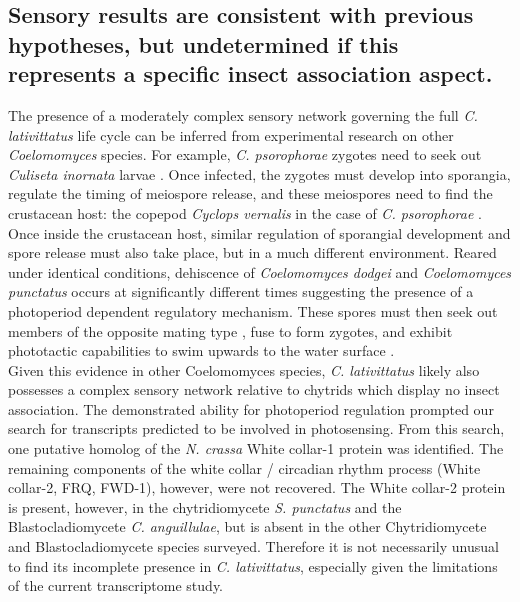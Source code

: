 \subsection*{Sensory results are consistent with previous hypotheses, but undetermined if this represents a specific insect association aspect.}
The presence of a moderately complex sensory network governing the full \textit{C. lativittatus} life cycle can be inferred from experimental research on other \textit{Coelomomyces} species. For example, \textit{C. psorophorae} zygotes need to seek out \textit{Culiseta inornata} larvae \cite{Whisler1975}. Once infected, the zygotes must develop into sporangia, regulate the timing of meiospore release, and these meiospores need to find the crustacean host: the copepod \textit{Cyclops vernalis} in the case of \textit{C. psorophorae} \cite{Whisler1974}. Once inside the crustacean host, similar regulation of sporangial development and spore release must also take place, but in a much different environment. Reared under identical conditions, dehiscence of \textit{Coelomomyces dodgei} and \textit{Coelomomyces punctatus} occurs at significantly different times \cite{Federici1983} suggesting the presence of a photoperiod dependent regulatory mechanism. These spores must then seek out members of the opposite mating type \cite{Federici1983}, fuse to form zygotes, and exhibit phototactic capabilities to swim upwards to the water surface \cite{Federici1983}. \\
\indent Given this evidence in other Coelomomyces species, \textit{C. lativittatus} likely also possesses a complex sensory network relative to chytrids which display no insect association. The demonstrated ability for photoperiod regulation prompted our search for transcripts predicted to be involved in photosensing. From this search, one putative homolog of the \textit{N. crassa} White collar-1 protein was identified. The remaining components of the white collar / circadian rhythm process (White collar-2, FRQ, FWD-1), however, were not recovered. The White collar-2 protein is present, however, in the chytridiomycete \textit{S. punctatus} and the Blastocladiomycete \textit{C. anguillulae}, but is absent in the other Chytridiomycete and Blastocladiomycete species surveyed. Therefore it is not necessarily unusual to find its incomplete presence in \textit{C. lativittatus}, especially given the limitations of the current transcriptome study. \\
